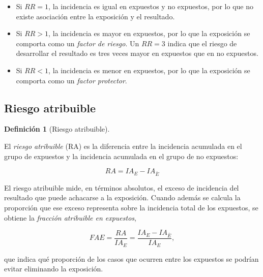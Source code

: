 \documentclass[
  spanish,
  a4paper,
]{scrreport}
\providecommand{\tightlist}{%
  \setlength{\itemsep}{0pt}\setlength{\parskip}{0pt}}
\theoremstyle{definition}
\theoremstyle{definition}
\newtheorem{definition}{Definición}[chapter]
\theoremstyle{remark}
\begin{document}
\begin{tcolorbox}[enhanced jigsaw, arc=.35mm, bottomrule=.15mm, bottomtitle=1mm, breakable, colback=white, colbacktitle=quarto-callout-note-color!10!white, colframe=quarto-callout-note-color-frame, coltitle=black, left=2mm, leftrule=.75mm, opacityback=0, opacitybacktitle=0.6, rightrule=.15mm, title=\textcolor{quarto-callout-note-color}{\faInfo}\hspace{0.5em}{Interpretación}, titlerule=0mm, toprule=.15mm, toptitle=1mm]

\begin{itemize}
\tightlist
\item
  Si \(RR=1\), la incidencia es igual en expuestos y no expuestos, por
  lo que no existe asociación entre la exposición y el resultado.
\item
  Si \(RR>1\), la incidencia es mayor en expuestos, por lo que la
  exposición se comporta como un \emph{factor de riesgo}. Un \(RR=3\)
  indica que el riesgo de desarrollar el resultado es tres veces mayor
  en expuestos que en no expuestos.
\item
  Si \(RR<1\), la incidencia es menor en expuestos, por lo que la
  exposición se comporta como un \emph{factor protector}.
\end{itemize}

\end{tcolorbox}

\subsection{Riesgo atribuible}\label{riesgo-atribuible}

\begin{definition}[Riesgo
atribuible]\protect\hypertarget{def-cohortes-riesgo-atribuible}{}\label{def-cohortes-riesgo-atribuible}

El \emph{riesgo atribuible} (RA) es la diferencia entre la incidencia
acumulada en el grupo de expuestos y la incidencia acumulada en el grupo
de no expuestos:

\[RA = IA_E - IA_{\bar E}\]

El riesgo atribuible mide, en términos absolutos, el exceso de
incidencia del resultado que puede achacarse a la exposición. Cuando
además se calcula la proporción que ese exceso representa sobre la
incidencia total de los expuestos, se obtiene la \emph{fracción
atribuible en expuestos},

\[FAE = \frac{RA}{IA_E} = \frac{IA_E - IA_{\bar E}}{IA_E},\]

que indica qué proporción de los casos que ocurren entre los expuestos
se podrían evitar eliminando la exposición.

\end{definition}
\end{document}
